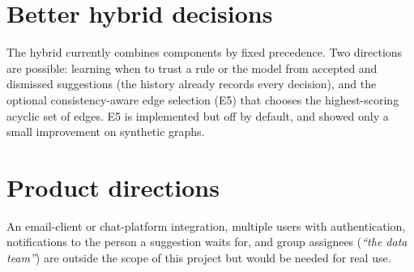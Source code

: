 \section{Better hybrid decisions}
The hybrid currently combines components by fixed precedence. Two directions are possible: learning when to trust a rule or the model from accepted and dismissed suggestions (the history already records every decision), and the optional consistency-aware edge selection (E5) that chooses the highest-scoring acyclic set of edges. E5 is implemented but off by default, and showed only a small improvement on synthetic graphs.

\section{Product directions}
An email-client or chat-platform integration, multiple users with authentication, notifications to the person a suggestion waits for, and group assignees (\emph{``the data team''}) are outside the scope of this project but would be needed for real use.
